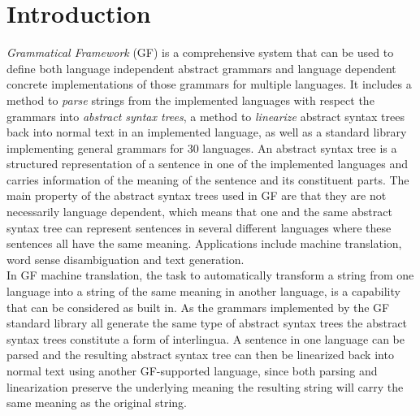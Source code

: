 \chapter{Introduction}


\emph{Grammatical Framework} (GF) is a comprehensive system that can be used to define both language independent abstract grammars and language dependent concrete implementations of those grammars for multiple languages. It includes a method to \emph{parse} strings from the implemented languages with respect the grammars into \emph{abstract syntax trees}, a method to \emph{linearize} abstract syntax trees back into normal text in an implemented language, as well as a standard library implementing general grammars for 30 languages. An abstract syntax tree is a structured representation of a sentence in one of the implemented languages and carries information of the meaning of the sentence and its constituent parts. The main property of the abstract syntax trees used in GF are that they are not necessarily language dependent, which means that one and the same abstract syntax tree can represent sentences in several different languages where these sentences all have the same meaning. Applications include machine translation, word sense disambiguation and text generation.
\\

In GF machine translation, the task to automatically transform a string from one language into a string of the same meaning in another language, is a capability that can be considered as built in. As the grammars implemented by the GF standard library all generate the same type of abstract syntax trees the abstract syntax trees constitute a form of interlingua. A sentence in one language can be parsed and the resulting abstract syntax tree can then be linearized back into normal text using another GF-supported language, since both parsing and linearization preserve the underlying meaning the resulting string will carry the same meaning as the original string.
\\

